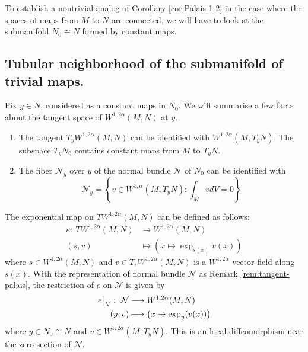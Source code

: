 To establish a nontrivial analog of Corollary \ref{cor:Palais-1-2} in the case where the
spaces of maps from \(M\) to \(N\) are connected, we will have to look at the
submanifold \(N_0\cong N\) formed by constant maps.

\subsection{Tubular neighborhood of the submanifold of trivial maps.}
\label{sec:orgcf6dde9}

Fix \(y\in N\), considered as a constant maps in \(N_0\). We will summarise a few facts about the tangent space of \(W^{1,2\alpha}(M,N)\) at \(y\).

\begin{remark}
\label{rem:tangent-palais}
\begin{enumerate}
\item The tangent \(T_y W^{1, 2\alpha}(M,N)\) can be identified with \(W^{1,2\alpha}(M, T_y
   N)\). The subspace \(T_y N_0\) contains constant maps from \(M\) to \(T_y N\).
\item The fiber \(\mathcal{N}_y\) over \(y\) of the normal bundle \(\mathcal{N}\) of \(N_0\) can be identified with
\[
    \mathcal{N}_y = \left\{v\in W^{1,\alpha}(M, T_y N): \int_M v dV = 0\right\}
   \]
\end{enumerate}
\end{remark}

The exponential map on \(TW^{1,2\alpha}(M,N)\) can be defined as follows:
\begin{align*}
  e:\ TW^{1,2\alpha}(M,N) & \longrightarrow W^{1,2\alpha}(M,N)\\
  (s,v) 		  &\longmapsto \left(x\mapsto \exp_{s(x)}v(x) \right)
\end{align*}
where \(s\in W^{1,2\alpha}(M,N)\) and \(v\in T_s W^{1,2\alpha}(M,N)\) is a \(W^{1,2\alpha}\) vector field along \(s(x)\). With the representation of normal bundle
\(\mathcal{N}\) as Remark \ref{rem:tangent-palais}, the restriction of \(e\) on \(\mathcal{N}\) is given by
\begin{align*}
\restr{e}{\mathcal{N}}:\ \mathcal{N} &\longrightarrow  W^{1,2\alpha}(M,N)\\
			 (y,v) &\longmapsto	       \left(x\mapsto \exp_y (v(x)) \right)
\end{align*}
where \(y\in N_0 \cong N\) and \(v \in W^{1,2\alpha}(M, T_yN)\). This is an local
diffeomorphism near the zero-section of \(\mathcal{N}\).

